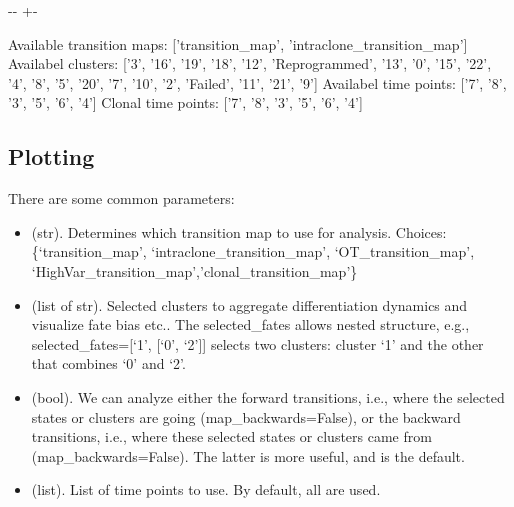 \documentclass[letterpaper,10pt,english]{sphinxmanual}
\newlength\nbsphinxcodecellspacing
\begin{document}
{
\begin{sphinxVerbatim}[commandchars=\\\{\}]
\llap{\color{nbsphinxin}[15]:\,\hspace{\fboxrule}\hspace{\fboxsep}}
\end{sphinxVerbatim}
}

{

\kern-\sphinxverbatimsmallskipamount\kern-\baselineskip
\kern+\FrameHeightAdjust\kern-\fboxrule
\vspace{\nbsphinxcodecellspacing}

\begin{sphinxVerbatim}[commandchars=\\\{\}]
Available transition maps: ['transition\_map', 'intraclone\_transition\_map']
Availabel clusters: ['3', '16', '19', '18', '12', 'Reprogrammed', '13', '0', '15', '22', '4', '8', '5', '20', '7', '10', '2', 'Failed', '11', '21', '9']
Availabel time points: ['7', '8', '3', '5', '6', '4']
Clonal time points: ['7', '8', '3', '5', '6', '4']
\end{sphinxVerbatim}
}


\subsection{Plotting}
\label{\detokenize{20210121_reprogramming_data_merge_tags:Plotting}}
There are some common parameters:
\begin{itemize}
\item {} 
 (str). Determines which transition map to use for analysis. Choices: \{‘transition\_map’, ‘intraclone\_transition\_map’, ‘OT\_transition\_map’, ‘HighVar\_transition\_map’,’clonal\_transition\_map’\}

\item {} 
 (list of str). Selected clusters to aggregate differentiation dynamics and visualize fate bias etc.. The selected\_fates allows nested structure, e.g., selected\_fates={[}‘1’, {[}‘0’, ‘2’{]}{]} selects two clusters: cluster ‘1’ and the other that combines ‘0’ and ‘2’.

\item {} 
 (bool). We can analyze either the forward transitions, i.e., where the selected states or clusters are going (map\_backwards=False), or the backward transitions, i.e., where these selected states or clusters came from (map\_backwards=False). The latter is more useful, and is the default.

\item {} 
 (list). List of time points to use. By default, all are used.

\end{itemize}
\end{document}
